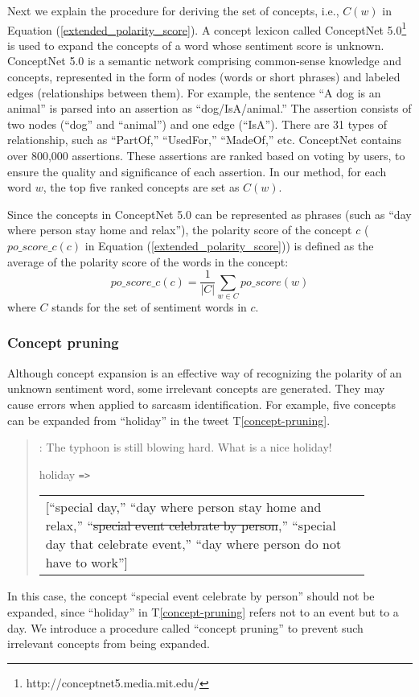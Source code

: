 \documentclass[english]{jnlp_1.4}
\def\extweet#1{}
\begin{document}
Next we explain the procedure for deriving the set of concepts, i.e., $C(w)$ in Equation (\ref{extended_polarity_score}).
A concept lexicon called ConceptNet 5.0\footnote{http://conceptnet5.media.mit.edu/} is used to expand the concepts of a word whose sentiment score is unknown.
ConceptNet 5.0 is a semantic network comprising common-sense knowledge and concepts, represented in the form of nodes (words or short phrases) and labeled edges (relationships between them).
For example, the sentence ``A dog is an animal'' is parsed into an assertion as ``dog/IsA/animal.''
The assertion consists of two nodes (``dog'' and ``animal'') and one edge (``IsA'').
There are 31 types of relationship, such as ``PartOf,'' ``UsedFor,'' ``MadeOf,'' etc.
ConceptNet contains over 800,000 assertions.
These assertions are ranked based on voting by users, to ensure the quality and significance of each assertion.
In our method, for each word $w$, the top five ranked concepts are set as $C(w)$.

Since the concepts in ConceptNet 5.0 can be represented as phrases (such as ``day where person stay home and relax''), the polarity score of the concept $c$ ($po\_score\_c(c)$ in Equation (\ref{extended_polarity_score})) is defined as the average of the polarity score of the words in the concept:
\begin{equation}
  \label{polarity_score_of_concept}
  po\_score\_c(c) = \frac{1}{|C|} \sum_{w \in C} po\_score(w)
\end{equation}
where $C$ stands for the set of sentiment words in $c$.


\subsubsection{Concept pruning}

Although concept expansion is an effective way of recognizing the polarity of an unknown sentiment word, some irrelevant concepts are generated.
They may cause errors when applied to sarcasm identification.
For example, five concepts can be expanded from ``holiday'' in the tweet T\ref{concept-pruning}.
\begin{quote}
  \extweet{concept-pruning}: The typhoon is still blowing hard. What is a nice holiday! \\
  {\small
  holiday \verb|=>|
  \begin{tabular}[t]{p{0.87\linewidth}@{}}
    [``special day,'' ``day where person stay home and relax,'' ``\st{special event celebrate by person},'' ``special day that celebrate event,'' ``day where person do not have to work'']    
  \end{tabular}
  }
\end{quote}
In this case, the concept ``special event celebrate by person'' should not be expanded, since ``holiday'' in T\ref{concept-pruning} refers not to an event but to a day.
We introduce a procedure called ``concept pruning'' to prevent such irrelevant concepts from being expanded.
\end{document}
